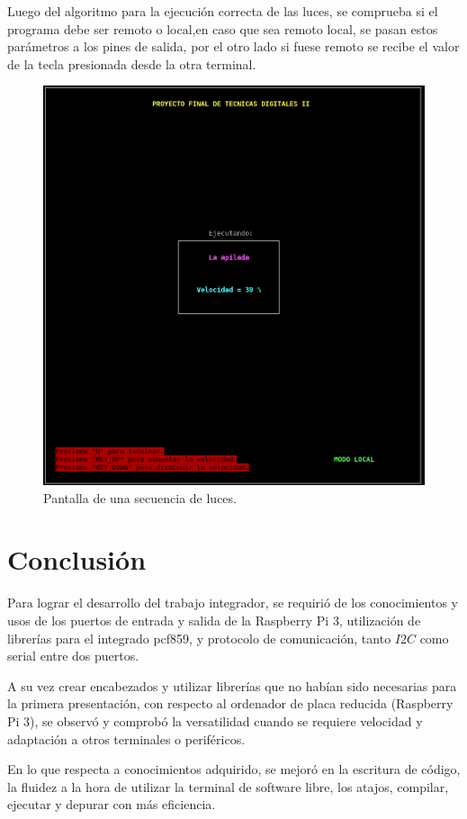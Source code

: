 \documentclass[11pt, a4paper]{article}
\begin{document}


Luego del algoritmo para la ejecución correcta de las luces, se comprueba si el programa debe ser remoto o local,en caso que sea remoto local, se pasan estos parámetros a los pines de salida, por el otro lado si fuese remoto se recibe el valor de la tecla presionada desde la otra terminal. 
\begin{figure}[H]
	\centering
	\includegraphics[width = 0.7 \columnwidth]{Imagenes/secuencia.png}
	\caption{Pantalla de una secuencia de luces.}
	\label{fig:secuencia}
\end{figure}

\section{Conclusión}
Para lograr el desarrollo del trabajo integrador, se requirió de los conocimientos y usos de los puertos de entrada y salida de la Raspberry Pi 3, utilización de librerías para el integrado pcf859, y protocolo de comunicación, tanto $I2C$ como serial entre dos puertos. 

A su vez crear encabezados y utilizar librerías que no habían sido necesarias para la primera presentación, con respecto al ordenador de placa reducida (Raspberry Pi 3), se observó y comprobó la versatilidad cuando se requiere velocidad y adaptación a otros terminales o periféricos.

En lo que respecta a conocimientos adquirido, se mejoró en la escritura de código, la fluidez a la hora de utilizar la terminal de software libre, los atajos, compilar, ejecutar y depurar con más eficiencia.
\end{document}

